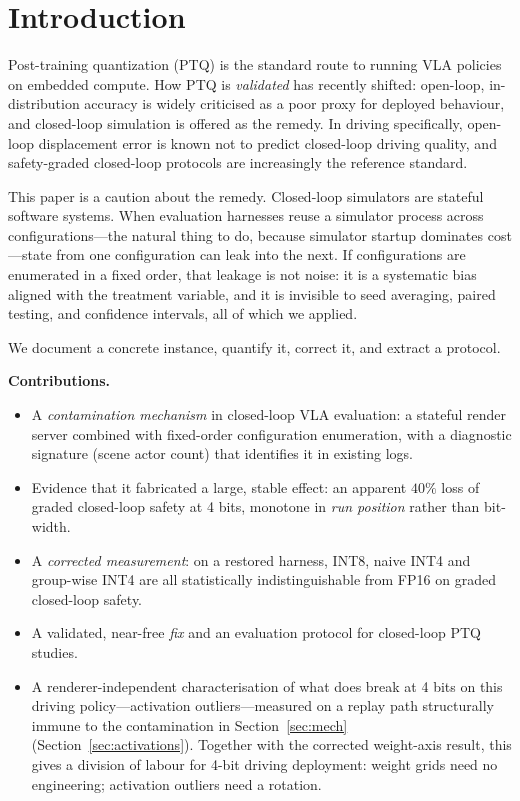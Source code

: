 \documentclass[conference]{IEEEtran}
\begin{document}
\section{Introduction}
Post-training quantization (PTQ) is the standard route to running VLA policies on embedded
compute. How PTQ is \emph{validated} has recently shifted: open-loop, in-distribution accuracy is
widely criticised as a poor proxy for deployed behaviour, and closed-loop simulation is offered as
the remedy. In driving specifically, open-loop displacement error is known not to predict
closed-loop driving quality, and safety-graded closed-loop protocols are increasingly the
reference standard.

This paper is a caution about the remedy. Closed-loop simulators are stateful software systems.
When evaluation harnesses reuse a simulator process across configurations---the natural thing to
do, because simulator startup dominates cost---state from one configuration can leak into the
next. If configurations are enumerated in a fixed order, that leakage is not noise: it is a
systematic bias aligned with the treatment variable, and it is invisible to seed averaging,
paired testing, and confidence intervals, all of which we applied.

We document a concrete instance, quantify it, correct it, and extract a protocol.

\textbf{Contributions.}
\begin{itemize}
\item A \emph{contamination mechanism} in closed-loop VLA evaluation: a stateful render server
combined with fixed-order configuration enumeration, with a diagnostic signature (scene actor
count) that identifies it in existing logs.
\item Evidence that it fabricated a large, stable effect: an apparent $40\%$ loss of graded
closed-loop safety at 4 bits, monotone in \emph{run position} rather than bit-width.
\item A \emph{corrected measurement}: on a restored harness, INT8, naive INT4 and group-wise INT4
are all statistically indistinguishable from FP16 on graded closed-loop safety.
\item A validated, near-free \emph{fix} and an evaluation protocol for closed-loop PTQ studies.
\item A renderer-independent characterisation of what does break at 4 bits on this driving
policy---activation outliers---measured on a replay path structurally immune to the contamination
in Section~\ref{sec:mech} (Section~\ref{sec:activations}). Together with the corrected weight-axis
result, this gives a division of labour for 4-bit driving deployment: weight grids need no
engineering; activation outliers need a rotation.
\end{itemize}
\end{document}
